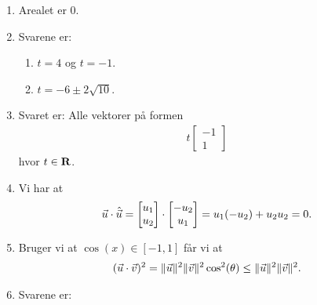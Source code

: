 \begin{enumerate}
	\item Arealet er $0$.
	
	\item Svarene er:
	\begin{enumerate}
		\item $t=4$ og $t=-1$.
		\item $t=-6\pm 2\sqrt{10}$.
	\end{enumerate}
	
	
	\item Svaret er: Alle vektorer på formen
	\begin{align*}
	t\begin{bmatrix}
	-1\\1
	\end{bmatrix}
	\end{align*}
	hvor $t\in \mathbf{R}$.
	
	\item Vi har at
	\begin{align*}
	\vec{u}\cdot \hat{\vec{u}}=\begin{bmatrix}
	u_1\\u_2
	\end{bmatrix}\cdot \begin{bmatrix}
	-u_2\\u_1
	\end{bmatrix} =u_1(-u_2)+u_2u_2=0.
	\end{align*}

	
	
	\item\label{it:2dvec11ans} Bruger vi at $\cos(x)\in [-1,1]$ får vi at
	\begin{align*}
	(\vec{u}\cdot \vec{v})^2 =\Vert \vec{u}\Vert^2\Vert \vec{v}\Vert^2\cos^2(\theta)\leq \Vert \vec{u}\Vert^2\Vert \vec{v}\Vert^2.
	\end{align*}
	
	\item\label{it:2dvec13ans} Svarene er:
	\begin{figure}
		\centering
\end{figure}
\end{enumerate}
